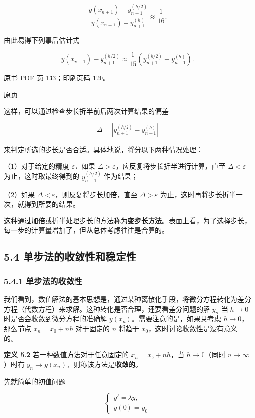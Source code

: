 \[
\frac{y(x_{n+1})-y_{n+1}^{(h/2)}}{y(x_{n+1})-y_{n+1}^{(h)}}\approx\frac{1}{16}.
\]

由此易得下列事后估计式

\[
y(x_{n+1})-y_{n+1}^{(h/2)}\approx\frac{1}{15}(y_{n+1}^{(h/2)}-y_{n+1}^{(h)}).
\]

\clearpage

原书 PDF 页 133；印刷页码 120。

\href{source-images/pdf-133.jpeg}{原页}

这样，可以通过检查步长折半前后两次计算结果的偏差

\[
\Delta=|y_{n+1}^{(h/2)}-y_{n+1}^{(h)}|
\]

来判定所选的步长是否合适。具体地说，将分以下两种情况处理：

（1）对于给定的精度 \(\varepsilon\)，如果 \(\Delta>\varepsilon\)，应反复将步长折半进行计算，直至 \(\Delta<\varepsilon\) 为止，这时取最终得到的 \(y_{n+1}^{(h/2)}\) 作为结果；

（2）如果 \(\Delta<\varepsilon\)，则反复将步长加倍，直至 \(\Delta>\varepsilon\) 为止，这时再将步长折半一次，就得到所要的结果。

这种通过加倍或折半处理步长的方法称为\textbf{变步长方法}。表面上看，为了选择步长，每一步的计算量增加了，但从总体考虑往往是合算的。

\subsection{5.4 单步法的收敛性和稳定性}\label{ch05a-ux5355ux6b65ux6cd5ux7684ux6536ux655bux6027ux548cux7a33ux5b9aux6027}

\subsubsection{5.4.1 单步法的收敛性}\label{ch05a-ux5355ux6b65ux6cd5ux7684ux6536ux655bux6027}

我们看到，数值解法的基本思想是，通过某种离散化手段，将微分方程转化为差分方程（代数方程）来求解。这种转化是否合理，还要看差分问题的解 \(y_n\) 当 \(h\to0\) 时是否会收敛到微分方程的准确解 \(y(x_n)\)。需要注意的是，如果只考虑 \(h\to0\)，那么节点 \(x_n=x_0+nh\) 对于固定的 \(n\) 将趋于 \(x_0\)，这时讨论收敛性是没有意义的。

\textbf{定义 5.2} 若一种数值方法对于任意固定的 \(x_n=x_0+nh\)，当 \(h\to0\)（同时 \(n\to\infty\)）时有 \(y_n\to y(x_n)\)，则称该方法是\textbf{收敛的}。

先就简单的初值问题

\[
\begin{cases}
y'=\lambda y,\\
y(0)=y_0
\end{cases}\tag{5.4.1}
\]

